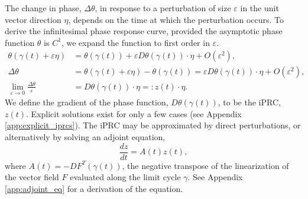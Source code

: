 \documentclass[12pt]{article}
\begin{document}
The change in phase, $\Delta \theta$, in response to a perturbation of size $\varepsilon$ in the unit vector direction $\eta$, depends on the time at which the perturbation occurs.  To derive the infinitesimal phase response curve, provided the asymptotic phase function $\theta$ is $C^1$, we expand the function to first order in $\varepsilon$.
\begin{equation}\label{eq:iprc_derivation}
\begin{split}
 \theta(\gamma(t) + \varepsilon \eta) &= \theta(\gamma(t)) + \varepsilon D\theta(\gamma(t))\cdot \eta + O(\varepsilon^2),\\
\Delta \theta &= \theta(\gamma(t) + \varepsilon \eta) - \theta(\gamma(t)) = \varepsilon D\theta(\gamma(t))\cdot \eta + O(\varepsilon^2),\\
\lim_{\varepsilon \rightarrow 0} \frac{\Delta \theta}{\varepsilon} &= D\theta(\gamma(t))\cdot \eta =: z(t) \cdot \eta.
\end{split}
\end{equation}
We define the gradient of the phase function, $D\theta(\gamma(t))$, to be the iPRC, $z(t)$.  Explicit solutions exist for only a few cases (see Appendix \ref{app:explicit_iprcs}).  The iPRC may be approximated by direct perturbations, or alternatively by solving an adjoint equation,
\begin{equation}
 \frac{dz}{dt} = A(t) z(t),
\label{eq:adjoint}\end{equation}
where $A(t) = -DF^T(\gamma(t))$, the negative transpose of the linearization of the vector field $F$ evaluated along the limit cycle $\gamma$.  See Appendix \ref{app:adjoint_eq} for a derivation of the equation.

%  
\end{document}

